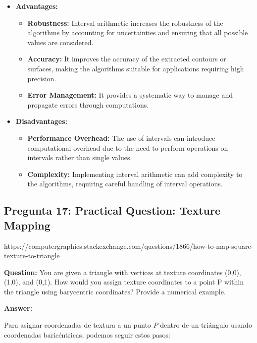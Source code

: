\documentclass{article}
\begin{document}
\begin{itemize}
    \item \textbf{Advantages:}
    \begin{itemize}
        \item \textbf{Robustness:} Interval arithmetic increases the robustness of the algorithms by accounting for uncertainties and ensuring that all possible values are considered.
        \item \textbf{Accuracy:} It improves the accuracy of the extracted contours or surfaces, making the algorithms suitable for applications requiring high precision.
        \item \textbf{Error Management:} It provides a systematic way to manage and propagate errors through computations.
    \end{itemize}
    \item \textbf{Disadvantages:}
    \begin{itemize}
        \item \textbf{Performance Overhead:} The use of intervals can introduce computational overhead due to the need to perform operations on intervals rather than single values.
        \item \textbf{Complexity:} Implementing interval arithmetic can add complexity to the algorithms, requiring careful handling of interval operations.
    \end{itemize}
\end{itemize}

\subsection{Pregunta 17: Practical Question: Texture Mapping}

https://computergraphics.stackexchange.com/questions/1866/how-to-map-square-texture-to-triangle

\textbf{Question:} You are given a triangle with vertices at texture coordinates (0,0), (1,0), and (0,1). How would you assign texture coordinates to a point P within the triangle using barycentric coordinates? Provide a numerical example.

\textbf{Answer:}

Para asignar coordenadas de textura a un punto $P$ dentro de un triángulo usando coordenadas baricéntricas, podemos seguir estos pasos:
\end{document}

